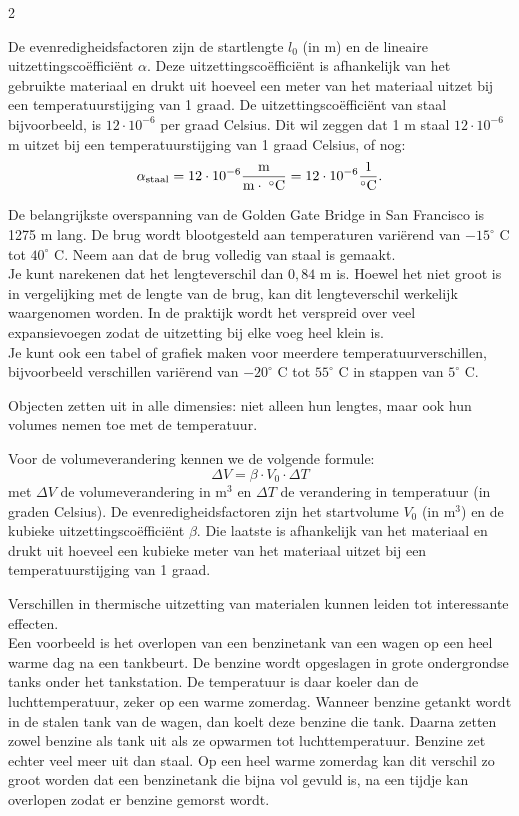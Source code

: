 \begin{multicols}{2}

De evenredigheidsfactoren zijn de startlengte $l_0$ (in m) en de lineaire uitzettingscoëfficiënt $\alpha$. Deze uitzettingscoëfficiënt is afhankelijk van het gebruikte materiaal en drukt uit hoeveel een meter van het materiaal uitzet bij een temperatuurstijging van 1 graad. De uitzettingscoëfficiënt van staal bijvoorbeeld, is $12\cdot 10^{-6}$ per graad Celsius. Dit wil zeggen dat 1 m staal $12\cdot  10^{-6}$ m uitzet bij een temperatuurstijging van 1 graad Celsius, of nog: $$\alpha_{\rm{staal}}=12\cdot 10^{-6}\frac{\mathrm{m}}{\mathrm{m}\cdot\; ^\circ\mathrm{C}}=12\cdot 10^{-6}\frac{1}{^\circ\mathrm{C}}.$$

De belangrijkste overspanning van de Golden Gate Bridge in San Francisco is 1275 m lang. De brug wordt blootgesteld aan temperaturen variërend van $-15^\circ$ C tot $40^\circ$ C. Neem aan dat de brug volledig van staal is gemaakt.\\

Je kunt narekenen dat het lengteverschil dan $0,84$ m is. Hoewel het niet groot is in vergelijking met de lengte van de brug, kan dit lengteverschil werkelijk waargenomen worden. In de praktijk wordt het verspreid over veel expansievoegen zodat de uitzetting bij elke voeg heel klein is.\\ 

Je kunt ook een tabel of grafiek maken voor meerdere temperatuurverschillen, bijvoorbeeld verschillen variërend van $-20^\circ$ C tot $55^\circ$ C in stappen van $5^\circ$ C.

Objecten zetten uit in alle dimensies: niet alleen hun lengtes, maar ook hun volumes nemen toe met de temperatuur.

Voor de volumeverandering kennen we de volgende formule: $$\Delta V=\beta \cdot V_0 \cdot \Delta T$$ met $\Delta V$ de volumeverandering in m$^3$ en $\Delta T$ de verandering in temperatuur (in graden Celsius). De evenredigheidsfactoren zijn het startvolume $V_0$ (in m$^3$) en de kubieke uitzettingscoëfficiënt $\beta$. Die laatste is afhankelijk van het materiaal en drukt uit hoeveel een kubieke meter van het materiaal uitzet bij een temperatuurstijging van 1 graad.

Verschillen in thermische uitzetting van materialen kunnen leiden tot interessante effecten.\\ 

Een voorbeeld is het overlopen van een benzinetank van een wagen op een heel warme dag na een tankbeurt. De benzine wordt opgeslagen in grote ondergrondse tanks onder het tankstation. De temperatuur is daar koeler dan de luchttemperatuur, zeker op een warme zomerdag. Wanneer benzine getankt wordt in de stalen tank van de wagen, dan koelt deze benzine die tank. Daarna zetten zowel benzine als tank uit als ze opwarmen tot luchttemperatuur. Benzine zet echter veel meer uit dan staal. Op een heel warme zomerdag kan dit verschil zo groot worden dat een benzinetank die bijna vol gevuld is, na een tijdje kan overlopen zodat er benzine gemorst wordt.


\end{multicols}
